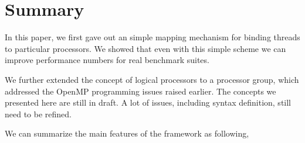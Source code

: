 \section{Summary} 
\label{summary}

In this paper, we first gave out an simple mapping mechanism for binding
threads to particular processors. We showed that even with this simple scheme
we can improve performance numbers for real benchmark suites. 

We further extended the concept of logical processors to a processor group,
which addressed the OpenMP programming issues raised earlier. The concepts we
presented here are still in draft. A lot of issues, including syntax
definition, still need to be refined. 

We can summarize the main features of the framework as following,

